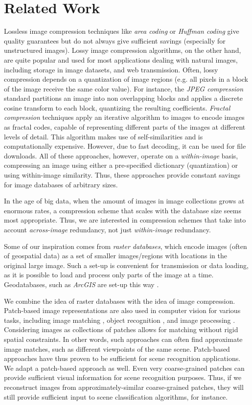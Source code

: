 \section{Related Work}\label{sec:related}

Lossless image compression techniques like \emph{area coding} or \emph{Huffman coding} give quality guarantees but do not always give sufficient savings (especially for unstructured images). Lossy image compression algorithms, on the other hand, are quite popular and used for most applications dealing with natural images, including storage in image datasets, and web transmission. Often, lossy compression depends on a quantization of image regions (e.g. all pixels in a block of the image receive the same color value). For instance, the \emph{JPEG compression} standard partitions an image into non overlapping blocks and applies a discrete cosine transform to each block, quantizing the resulting coefficients. \emph{Fractal compression} techniques \cite{Jacquin} apply an iterative algorithm to images to encode images as fractal codes, capable of representing different parts of the images at different levels of detail. This algorithm makes use of self-similarities and is computationally expensive. However, due to fast decoding, it can be used for file downloads. All of these approaches, however, operate on a \emph{within-image} basis, compressing an image using either a pre-specified dictionary (quantization) or using within-image similarity. Thus, these approaches provide constant savings for image databases of arbitrary sizes.

In the age of big data, when the amount of images in image collections grows at enormous rates, a compression scheme that scales with the database size seems most appropriate. Thus, we are interested in compression schemes that take into account \emph{across-image} redundancy, not just \emph{within-image} redundancy. 

Some of our inspiration comes from \emph{raster databases}, which encode images (often of geospatial data) as a set of smaller images/regions with locations in the original large image. Such a set-up is convenient for transmission or data loading, as it is possible to load and process only parts of the image at a time. Geodatabases, such as \emph{ArcGIS} are set-up this way \cite{ArcGIS}.

We combine the idea of raster databases with the idea of image compression. Patch-based image representations are also used in computer vision for various tasks, including image matching \cite{Brown05}, object recognition \cite{vashist2006dps}, and image processing \cite{Barnes2009}. Considering images as collections of patches allows for matching without rigid spatial constraints. In other words, such approaches can often find approximate image matches, such as different viewpoints of the same scene. Patch-based approaches have thus proven to be sufficient for scene recognition applications. We adapt a patch-based approach as well. Even very coarse-grained patches can provide sufficient visual information for scene recognition purposes. Thus, if we reconstruct images from approximately-similar coarse-grained patches, they will still provide sufficient input to scene classification algorithms, for instance.